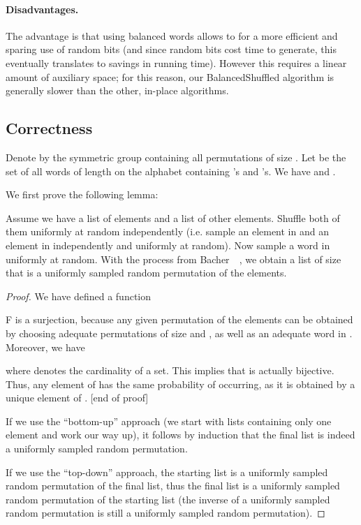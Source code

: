 \documentclass[letter,11pt,en]{quick-document}
\begin{document}
\paragraph{Disadvantages.} The advantage is that using balanced words
allows to for a more efficient and sparing use of random bits (and since
random bits cost time to generate, this eventually translates to savings
in running time). However this requires a linear amount of auxiliary
space; for this reason, our BalancedShuffled algorithm is generally slower
than the other, in-place algorithms.

\subsection{Correctness}

Denote by  the symmetric group containing all permutations of size . Let  be the set of all words of length  on the alphabet  containing  's and  's. We have  and .

We first prove the following lemma:

\begin{lemma}
  Assume we have a list of  elements and a list of  other elements.
  Shuffle both of them uniformly at random independently (i.e. sample an
  element in  and an element in  independently and uniformly at
  random). Now sample a word in  uniformly at random. With the
  process from Bacher~\etal~\cite{BaBoJa14}, we obtain a list of size
   that is a uniformly sampled random permutation of the 
  elements.
\end{lemma}

\begin{proof}
  We have defined a function


F is a surjection, because any given permutation of the  elements can
be obtained by choosing adequate permutations of size  and , as well
as an adequate word in . Moreover, we have


where  denotes the cardinality of a set. This implies that  is
actually bijective. Thus, any element of  has the same
probability of occurring, as it is obtained by a unique element of
. [end of proof]

If we use the ``bottom-up'' approach (we start with lists containing only
one element and work our way up), it follows by induction that the final
list is indeed a uniformly sampled random permutation.

If we use the ``top-down'' approach, the starting list is a uniformly
sampled random permutation of the final list, thus the final list is a
uniformly sampled random permutation of the starting list (the inverse of
a uniformly sampled random permutation is still a uniformly sampled random
permutation).
\end{proof}
\end{document}

